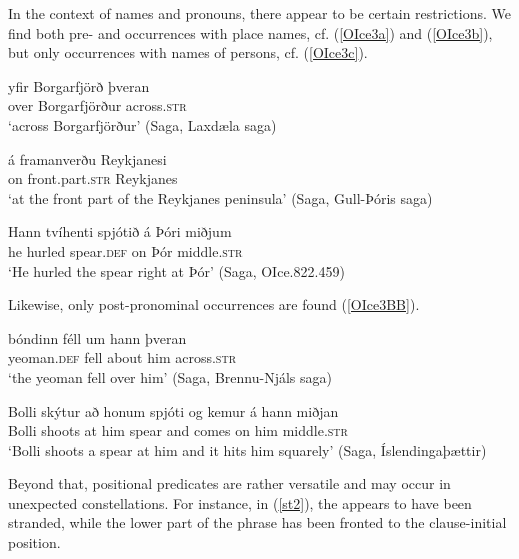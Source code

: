 \documentclass[output=paper,colorlinks,citecolor=brown]{langscibook}
\begin{document}
In the context of names and pronouns, there appear to be certain restrictions.   
We find both pre- and  occurrences with place names,  cf.  (\ref{OIce3a}) and (\ref{OIce3b}), but only  occurrences with names of persons, cf. (\ref{OIce3c}).  

\begin{exe}
   \ex \label{OIce3} 
    \begin{xlist}
       \ex \label{OIce3a} \gll    yfir  Borgarfjörð  þveran   \\
         over Borgarfjörður across.\textsc{str}  \\ 
   \glt `across Borgarfjörður' (Saga, Laxdæla saga) 

      \ex \label{OIce3b} \gll  á framanverðu  Reykjanesi  \\ 
        on front.part.\textsc{str} Reykjanes    \\ 
        \glt  `at the front part of the Reykjanes peninsula' (Saga, Gull-Þóris saga) 

      \ex \label{OIce3c} \gll  Hann tvíhenti spjótið á Þóri miðjum \\  
        he hurled spear.\textsc{def} on Þór middle.\textsc{str} \\  
        \glt  `He hurled the spear right at Þór' (Saga, OIce.822.459)

    \end{xlist}
\end{exe} 

Likewise, only post-pronominal occurrences are found (\ref{OIce3BB}).

\begin{exe}
   \ex \label{OIce3BB}  
    \begin{xlist}
     \ex \gll bóndinn féll um  hann þveran  \\
       yeoman.\textsc{def} fell about him across.\textsc{str}   \\ 
        \glt  `the yeoman fell over him' (Saga, Brennu-Njáls saga)

       \ex \gll  Bolli skýtur að  honum spjóti og kemur á hann miðjan  \\
         Bolli shoots at him spear and comes on him middle.\textsc{str} \\  
        \glt `Bolli shoots a spear at him and it hits him squarely' (Saga, Íslendingaþættir)
    \end{xlist}
\end{exe} 

Beyond that, positional predicates are rather versatile and may occur in unexpected constellations. For instance, %
in (\ref{st2}), the  appears to have been stranded, while the lower part of the  phrase has been fronted to the clause-initial position.
\end{document}
